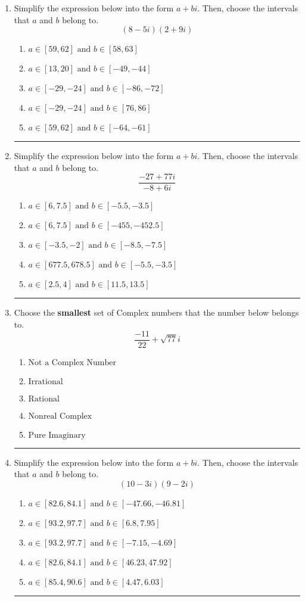 \documentclass[14pt]{extbook}
\newcommand{\litem}[1]{\item#1\hspace*{-1cm}\rule{\textwidth}{0.4pt}}
\begin{document}
\begin{enumerate}
{\begin{enumerate}[label=\Alph*.]
\end{enumerate} }
\litem{
Simplify the expression below into the form $a+bi$. Then, choose the intervals that $a$ and $b$ belong to.\[ (8 - 5 i)(2 + 9 i) \]\begin{enumerate}[label=\Alph*.]
\item \( a \in [59, 62] \text{ and } b \in [58, 63] \)
\item \( a \in [13, 20] \text{ and } b \in [-49, -44] \)
\item \( a \in [-29, -24] \text{ and } b \in [-86, -72] \)
\item \( a \in [-29, -24] \text{ and } b \in [76, 86] \)
\item \( a \in [59, 62] \text{ and } b \in [-64, -61] \)

\end{enumerate} }
\litem{
Simplify the expression below into the form $a+bi$. Then, choose the intervals that $a$ and $b$ belong to.\[ \frac{-27 + 77 i}{-8 + 6 i} \]\begin{enumerate}[label=\Alph*.]
\item \( a \in [6, 7.5] \text{ and } b \in [-5.5, -3.5] \)
\item \( a \in [6, 7.5] \text{ and } b \in [-455, -452.5] \)
\item \( a \in [-3.5, -2] \text{ and } b \in [-8.5, -7.5] \)
\item \( a \in [677.5, 678.5] \text{ and } b \in [-5.5, -3.5] \)
\item \( a \in [2.5, 4] \text{ and } b \in [11.5, 13.5] \)

\end{enumerate} }
\litem{
Choose the \textbf{smallest} set of Complex numbers that the number below belongs to.\[ \frac{-11}{22}+\sqrt{77} i \]\begin{enumerate}[label=\Alph*.]
\item \( \text{Not a Complex Number} \)
\item \( \text{Irrational} \)
\item \( \text{Rational} \)
\item \( \text{Nonreal Complex} \)
\item \( \text{Pure Imaginary} \)

\end{enumerate} }
\litem{
Simplify the expression below into the form $a+bi$. Then, choose the intervals that $a$ and $b$ belong to.\[ (10 - 3 i)(9 - 2 i) \]\begin{enumerate}[label=\Alph*.]
\item \( a \in [82.6, 84.1] \text{ and } b \in [-47.66, -46.81] \)
\item \( a \in [93.2, 97.7] \text{ and } b \in [6.8, 7.95] \)
\item \( a \in [93.2, 97.7] \text{ and } b \in [-7.15, -4.69] \)
\item \( a \in [82.6, 84.1] \text{ and } b \in [46.23, 47.92] \)
\item \( a \in [85.4, 90.6] \text{ and } b \in [4.47, 6.03] \)


\end{enumerate}}
\end{enumerate}
\end{document}
